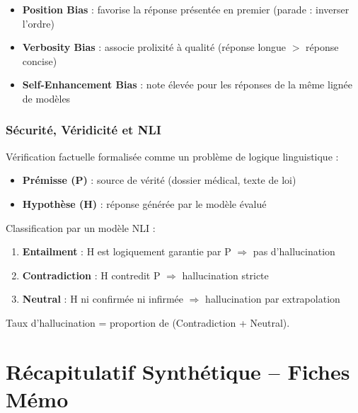 \documentclass[a4paper,10pt]{article}
\begin{document}
\begin{warningbox}
\begin{itemize}
  \item \textbf{Position Bias} : favorise la réponse présentée en premier (parade : inverser l'ordre)
  \item \textbf{Verbosity Bias} : associe prolixité à qualité (réponse longue $>$ réponse concise)
  \item \textbf{Self-Enhancement Bias} : note élevée pour les réponses de la même lignée de modèles
\end{itemize}
\end{warningbox}

\subsubsection{Sécurité, Véridicité et NLI}

\begin{definitionbox}
Vérification factuelle formalisée comme un problème de logique linguistique :
\begin{itemize}
  \item \textbf{Prémisse (P)} : source de vérité (dossier médical, texte de loi)
  \item \textbf{Hypothèse (H)} : réponse générée par le modèle évalué
\end{itemize}
Classification par un modèle NLI :
\begin{enumerate}
  \item \textbf{Entailment} : H est logiquement garantie par P $\Rightarrow$ pas d'hallucination
  \item \textbf{Contradiction} : H contredit P $\Rightarrow$ hallucination stricte
  \item \textbf{Neutral} : H ni confirmée ni infirmée $\Rightarrow$ hallucination par extrapolation
\end{enumerate}
Taux d'hallucination = proportion de (Contradiction + Neutral).
\end{definitionbox}

\section{Récapitulatif Synthétique -- Fiches Mémo}
\end{document}
